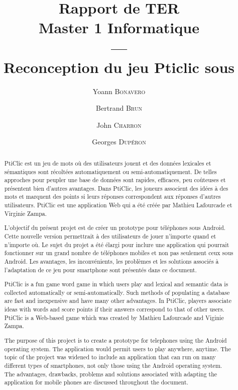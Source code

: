 \documentclass[a4paper,11pt,french]{article}
\title{Rapport de TER
\\Master 1 Informatique
\\---\\
Reconception du jeu Pticlic sous \android{}}
\author{Yoann \textsc{Bonavero} \and Bertrand \textsc{Brun} \and John \textsc{Charron} \and Georges \textsc{Dupéron}}
\begin{document}
\maketitle

\pagestyle{empty}
\thispagestyle{empty}

\tableofcontents


\pagestyle{empty}
\thispagestyle{empty}
\newpage
{}
\setcounter{page}{1}
\pagestyle{plain}

\begin{abstract}
  PtiClic est un jeu de mots où des utilisateurs jouent et des données lexicales et sémantiques sont récoltées automatiquement ou
  semi-automatiquement. De telles approches pour peupler une base de données sont rapides, efficaces, peu coûteuses et présentent bien
  d'autres avantages. Dans PtiClic, les joueurs associent des idées à des mots et marquent des points si leurs réponses correspondent aux
  réponses d'autres utilisateurs. PtiClic est une application Web qui a été créée par Mathieu Lafourcade et Virginie Zampa.

  L'objectif du présent projet est de créer un prototype pour téléphones sous Android. Cette nouvelle version permettrait à des utilisateurs
  de jouer n'importe quand et n'importe où. Le sujet du projet a été élargi pour inclure une application qui pourrait fonctionner sur un
  grand nombre de téléphones mobiles et non pas seulement ceux sous Android. Les avantages, les inconvénients, les problèmes et les
  solutions associés à l'adaptation de ce jeu pour smartphone sont présentés dans ce document.
\end{abstract}

\begin{abstract}
  PtiClic is a fun game word game in which users play and lexical and semantic data is collected automatically or semi-automatically. Such
  methods of populating a database are fast and inexpensive and have many other advantages. In PtiClic, players associate ideas with words
  and score points if their answers correspond to that of other users. PtiClic is a Web-based game which was created by Mathieu Lafourcade
  and Viginie Zampa.

  The purpose of this project is to create a prototype for telephones using the Android operating system. The application would permit users
  to play anywhere, anytime. The topic of the project was widened to include an application that can run on many different types of
  smartphones, not only those using the Android operating system. The advantages, drawbacks, problems and solutions associated with adapting
  the application for mobile phones are discussed throughout the document.
\end{abstract}
\pagebreak
\end{document}
